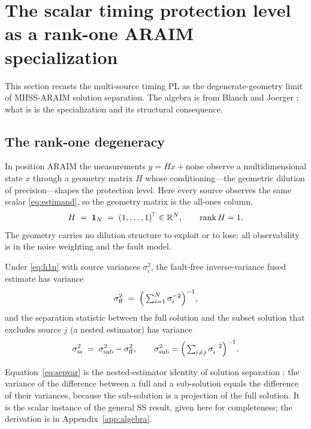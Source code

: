 \section{The scalar timing protection level as a rank-one ARAIM specialization}
\label{sec:scalar}

This section recasts the multi-source timing PL as the degenerate-geometry limit
of MHSS-ARAIM solution separation. The algebra is \Cited{} from
Blanch \citep{blanch2015} and Joerger \citep{joerger2014}; what is \Proven{} is
the specialization and its structural consequence.

\subsection{The rank-one degeneracy}
\label{sec:ranktone}

In position ARAIM the measurements $y=Hx+\text{noise}$ observe a multidimensional
state $x$ through a geometry matrix $H$ whose conditioning---the
geometric dilution of precision---shapes the protection level. Here every source
observes the same scalar \eqref{eq:estimand}, so the geometry matrix is the
all-ones column,
\begin{equation}
  H \;=\; \bm 1_N \;=\; (1,\dots,1)^{\!\top}\in\mathbb{R}^{N},
  \qquad \operatorname{rank}H = 1.
  \label{eq:h1n}
\end{equation}
The geometry carries no dilution structure to exploit or to lose: all
observability is in the noise weighting and the fault model.

\begin{proposition}
\label{prop:fusion}
Under \eqref{eq:h1n} with source variances $\sigma_i^2$, the fault-free
inverse-variance fused estimate has variance
\begin{equation}
  \sigma_{\mathrm{ff}}^{2} \;=\; \Big(\textstyle\sum_{i=1}^{N}\sigma_i^{-2}\Big)^{-1},
  \label{eq:fused}
\end{equation}
and the separation statistic between the full solution and the subset solution
that excludes source $j$ (a nested estimator) has variance
\begin{equation}
  \sigma_{\mathrm{ss}}^{2} \;=\; \sigma_{\mathrm{sub}}^{2}-\sigma_{\mathrm{ff}}^{2},
  \qquad
  \sigma_{\mathrm{sub}}^{2}=\Big(\textstyle\sum_{i\neq j}\sigma_i^{-2}\Big)^{-1}.
  \label{eq:sepvar}
\end{equation}
\end{proposition}

Equation~\eqref{eq:sepvar} is the nested-estimator identity of solution
separation \citep{joerger2014}: the variance of the difference between a full and
a sub-solution equals the difference of their variances, because the sub-solution
is a projection of the full solution. It is the scalar instance of the general SS
result, given here for completeness; the derivation is in
Appendix~\ref{app:algebra}.

